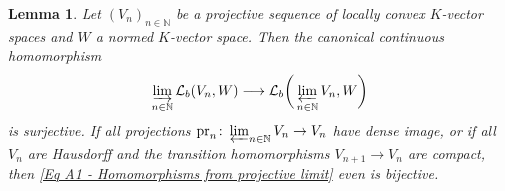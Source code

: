 \documentclass[a4paper, reqno, 10pt]{amsart}
\newtheorem{lemma}[theorem]{Lemma}
\theoremstyle{definition}
\numberwithin{equation}{section}
\newcommand{\lra}{\longrightarrow}
\newcommand{\pr}{{\mathrm{pr}}}
\newcommand{\ra}{\rightarrow}
\newcommand{\BN}{{\mathbb {N}}}
\newcommand{\CL}{{\mathcal {L}}}
\begin{document}
\begin{lemma}\label{Lemma A1 - Homomorphisms from projective limit into normed space}
Let $(V_n)_{n\in \BN}$ be a projective sequence of locally convex $K$-vector spaces and $W$ a normed $K$-vector space.
Then the canonical continuous homomorphism
\begin{equation}\label{Eq A1 - Homomorphisms from projective limit}
	\varinjlim_{n\in \BN} \CL_b(V_n,W) \lra \CL_b \bigg(\varprojlim_{n\in \BN} V_n, W \bigg)
\end{equation}
is surjective.
If all projections $\pr_n \colon \varprojlim_{n\in \BN} V_n \ra V_n$ have dense image, or if all $V_n$ are Hausdorff and the transition homomorphisms $V_{n+1} \ra V_n$ are compact, then \eqref{Eq A1 - Homomorphisms from projective limit} even is bijective.	
\end{lemma}
\end{document}
